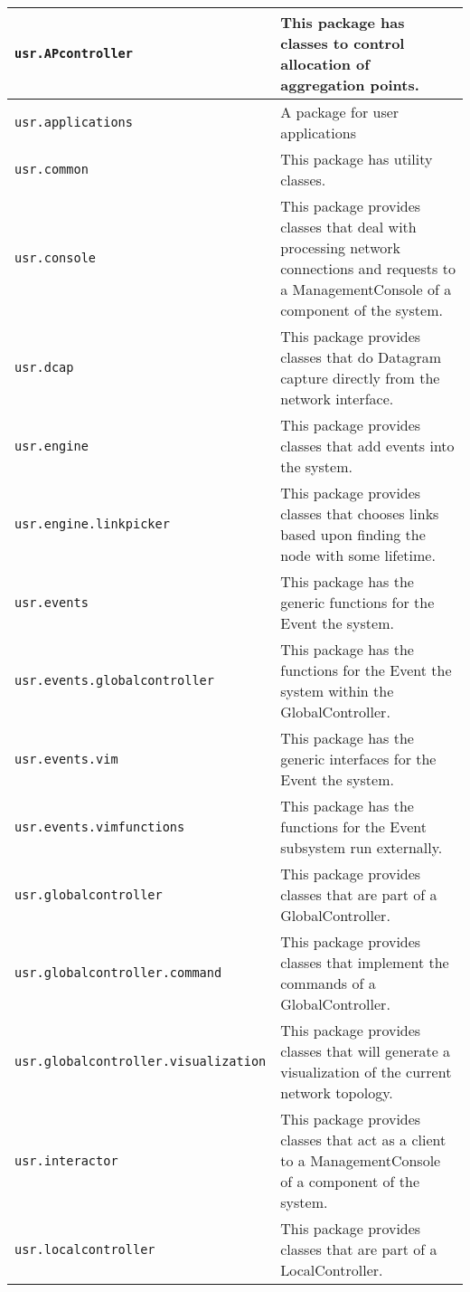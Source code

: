 {\begin{longtable}[l]{ | p{5.5cm} | p{8.5cm} | }
\hline
\footnotesize{\texttt{usr.APcontroller}} & This package has classes to control allocation of aggregation points. \\
\hline
\footnotesize{\texttt{usr.applications}} & A package for user applications \\
\hline
\footnotesize{\texttt{usr.common}} & This package has utility classes. \\
\hline
\footnotesize{\texttt{usr.console}} & This package provides classes that deal with processing network connections and requests to a ManagementConsole of a component of the system. \\
\hline
\footnotesize{\texttt{usr.dcap}} & This package provides classes that
do Datagram capture directly from the network interface. \\
\hline
\footnotesize{\texttt{usr.engine}} & This package provides classes that add events into the system. \\
\hline
\footnotesize{\texttt{usr.engine.linkpicker}} & This package provides classes that chooses links based upon finding the node with some lifetime. \\
\hline
\footnotesize{\texttt{usr.events}} & This package  has the generic functions for the Event  the system. \\
\hline
\footnotesize{\texttt{usr.events.globalcontroller}} & This package
has the functions for the Event  the system within the GlobalController. \\
\hline
\footnotesize{\texttt{usr.events.vim}} & This package  has the generic interfaces for the Event  the system. \\
\hline
\footnotesize{\texttt{usr.events.vimfunctions}} & This package
has the functions for the Event subsystem run externally. \\
\hline
\footnotesize{\texttt{usr.globalcontroller}} & This package provides classes that are part of a GlobalController. \\
\hline
\footnotesize{\texttt{usr.globalcontroller.command}} & This package provides classes that implement the commands of a GlobalController. \\
\hline
\footnotesize{\texttt{usr.globalcontroller.visualization}} & This package provides classes that  will generate a visualization of the current network topology. \\
\hline
\footnotesize{\texttt{usr.interactor}} & This package provides classes that act as a client to a ManagementConsole of a component of the system. \\
\hline
\footnotesize{\texttt{usr.localcontroller}} & This package provides classes that are part of a LocalController. \\

\end{longtable}}
